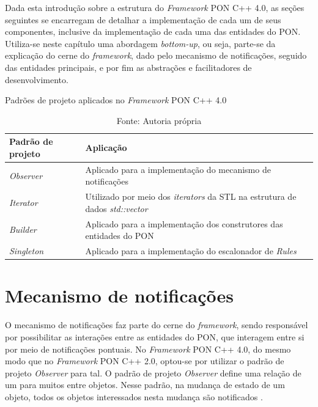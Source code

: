 Dada esta introdução sobre a estrutura do \textit{Framework} PON C++ 4.0, as
seções seguintes se encarregam de detalhar a implementação de cada um de seus
componentes, inclusive da implementação de cada uma das entidades do PON.
Utiliza-se neste capítulo uma abordagem \textit{bottom-up}, ou seja, parte-se da
explicação do cerne do \textit{framework}, dado pelo mecanismo de notificações,
seguido das entidades principais, e por fim as abstrações e facilitadores de
desenvolvimento.

\begin{table}[!htb]
    \centering
    \caption{Padrões de projeto aplicados no \textit{Framework} PON C++ 4.0}
    \smallskip
    \begin{tabularx}{\textwidth}{|l|X|}\hline
        Padrão de projeto & Aplicação   \\\hline\hline
        \textit{Observer} & Aplicado para a implementação do mecanismo de notificações \\ \hline%
        \textit{Iterator} & Utilizado por meio dos \textit{iterators} da STL na estrutura de dados \textit{std::vector} \\ \hline
        \textit{Builder} & Aplicado para a implementação dos construtores das entidades do PON \\ \hline%
        \textit{Singleton} & Aplicado para a implementação do escalonador de
        \textit{Rules} \\ \hline%
    \end{tabularx}
    \caption*{Fonte: Autoria própria}
    \label{tab:padroes}
    \end{table}

\section{Mecanismo de notificações}\label{sec:observer}

O mecanismo de notificações faz parte do cerne do \textit{framework}, sendo
responsável por possibilitar as interações entre as entidades do PON, que
interagem entre si por meio de notificações pontuais. No \textit{Framework} PON
C++ 4.0, do mesmo modo que no \textit{Framework} PON C++ 2.0, optou-se por
utilizar o padrão de projeto \textit{Observer} para tal. O padrão de projeto
\textit{Observer} define uma relação de um para muitos entre objetos. Nesse
padrão, na mudança de estado de um objeto, todos os objetos interessados nesta
mudança são notificados \cite{gamma_1995,msc_Ronszcka_2012}.

